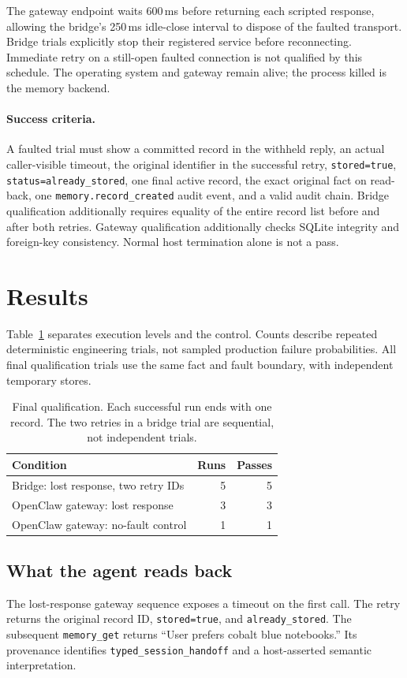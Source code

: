 \documentclass[10pt,twocolumn]{article}
\begin{document}
The gateway endpoint waits 600\,ms before returning each scripted response,
allowing the bridge's 250\,ms idle-close interval to dispose of the faulted
transport. Bridge trials explicitly stop their registered service before
reconnecting. Immediate retry on a still-open faulted connection is not
qualified by this schedule. The operating system and gateway remain alive;
the process killed is the memory backend.

\paragraph{Success criteria.}
A faulted trial must show a committed record in the withheld reply, an actual
caller-visible timeout, the original identifier in the successful retry,
\texttt{stored=true}, \texttt{status=already\_stored}, one final active record,
the exact original fact on read-back, one \texttt{memory.record\_created}
audit event, and a valid audit chain. Bridge qualification additionally
requires equality of the entire record list before and after both retries.
Gateway qualification additionally checks SQLite integrity and foreign-key
consistency. Normal host termination alone is not a pass.

\section{Results}
Table~\ref{tab:results} separates execution levels and the control. Counts
describe repeated deterministic engineering trials, not sampled production
failure probabilities. All final qualification trials use the same fact and
fault boundary, with independent temporary stores.

\begin{table}[ht]
\centering\small
\caption{Final qualification. Each successful run ends with one record.
The two retries in a bridge trial are sequential, not independent trials.}
\label{tab:results}
\begin{tabularx}{\columnwidth}{@{}Xrr@{}}
\toprule
Condition & Runs & Passes\\
\midrule
Bridge: lost response, two retry IDs & 5 & 5\\
OpenClaw gateway: lost response & 3 & 3\\
OpenClaw gateway: no-fault control & 1 & 1\\
\bottomrule
\end{tabularx}
\end{table}

\subsection{What the agent reads back}
The lost-response gateway sequence exposes a timeout on the first call.
The retry returns the original record ID, \texttt{stored=true}, and
\texttt{already\_stored}. The subsequent \texttt{memory\_get} returns
``User prefers cobalt blue notebooks.'' Its provenance identifies
\texttt{typed\_session\_handoff} and a host-asserted semantic interpretation.
\end{document}
